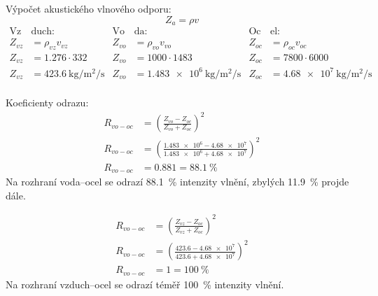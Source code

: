 Výpočet akustického vlnového odporu:
\[
    Z_{a} = \rho v
\]
\begin{align*}
  \text{Vz}&\text{duch:} & \text{Vo}&\text{da:} & \text{Oc}&\text{el:} \\
  Z_{vz} &= \rho_{vz} v_{vz} & Z_{vo} &= \rho_{vo} v_{vo} & Z_{oc} &= \rho_{oc} v_{oc} \\
  Z_{vz} &= \num{1,276}\cdot\num{332} & Z_{vo} &= \num{1000}\cdot\num{1483} & Z_{oc} &= \num{7800}\cdot\num{6000} \\
  Z_{vz} &= \qty{423.6}{\kilo\gram\per\square\meter\per\second} & Z_{vo} &= \qty{1.483e6}{\kilo\gram\per\square\meter\per\second} & Z_{oc} &= \qty{4.68e7}{\kilo\gram\per\square\meter\per\second} \\
\end{align*}

Koeficienty odrazu:
\begin{align*}
  R_{vo-oc} &= \left( \frac{Z_{vo}-Z_{oc}}{Z_{vo}+Z_{oc}} \right)^2 \\
  R_{vo-oc} &= \left( \frac{\num{1,483e6}-\num{4,68e7}}{\num{1,483e6}+\num{4,68e7}} \right)^2 \\
  R_{vo-oc} &= \num{0,881} = \qty{88,1}{\percent}  
\end{align*}
Na rozhraní voda--ocel se odrazí \qty{88,1}{\percent} intenzity vlnění, zbylých \qty{11,9}{\percent} projde dále.

\begin{align*}
    R_{vo-oc} &= \left( \frac{Z_{vz}-Z_{oc}}{Z_{vz}+Z_{oc}} \right)^2 \\
    R_{vo-oc} &= \left( \frac{\num{423,6}-\num{4,68e7}}{\num{423,6}+\num{4,68e7}} \right)^2 \\
    R_{vo-oc} &= \num{1} = \qty{100}{\percent}  
\end{align*}
Na rozhraní vzduch--ocel se odrazí téměř \qty{100}{\percent} intenzity vlnění.
